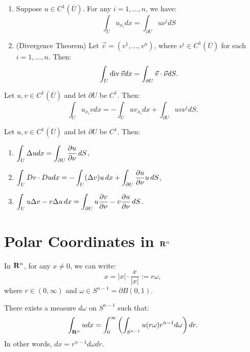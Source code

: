 \begin{theorem}
	\phantom{a}
	\begin{enumerate}[label = (\alph*),itemsep=1pt,topsep=3pt]
		\item Suppose $u \in C^1(\overline{U})$. For any $i=1,\ldots,n$, we have:
		\[
			\int_{U}^{} u_{x_i}dx = \int_{\partial U}^{} u \nu^i dS
		\]
		\item (Divergence Theorem) Let $\vec{v} = (v^1,\ldots,v^n)$, where $v^i \in C^1(\overline{U})$ for each $i=1,\ldots,n$. Then:
			\[
				\int_{U}^{} \operatorname{div} \vec{v}dx = \int_{\partial U}^{} \vec{v}\cdot \vec{\nu}dS.
			\] 	
	\end{enumerate}
\end{theorem}

\begin{theorem}
	Let $u,v \in C^1(\overline{U})$ and let $\partial U$ be $C^1$. Then:
	\[
		\int_{U}^{} u_{x_i}v dx = - \int_{U}^{} u v_{x_i} dx + \int_{\partial U}^{} uv \nu^i dS.
	\] 
\end{theorem}

\begin{theorem}
	Let $u,v \in C^1(\overline{U})$ and let $\partial U$ be $C^1$. Then:
	\begin{enumerate}[label = (\alph*),itemsep=1pt,topsep=3pt]
        \item $\displaystyle \int_U \Delta u dx = \int_{\partial U}\frac{\partial u}{\partial \nu}\,dS$,
        \item $\displaystyle \int_U Dv \cdot Du dx = -\int_U (\Delta v)u\,dx + \int_{\partial U}\frac{\partial u}{\partial \nu} u\,dS$, 
        \item $\displaystyle \int_U u \Delta v - v \Delta u\,dx = \int_{\partial U} u\frac{\partial v}{\partial \nu} - v \frac{\partial u}{\partial \nu}\,dS$.
    \end{enumerate}
\end{theorem}
	
\section{Polar Coordinates in $\mathbf{R}^n$ }

\begin{remark}
	In $\mathbf{R}^n$, for any $x \neq 0$, we can write:
	\[
	x = |x| \cdot \frac{x}{|x|} := r \omega,
	\] 
	where $r\in (0,\infty)$ and $\omega \in S^{n-1} = \partial B(0,1)$.
\end{remark}

\begin{theorem}
	There exists a measure $d \omega$ on $S^{n-1}$ such that:
	\[
		\int_{\mathbf{R}^n}^{}u dx = \int_{0}^{\infty} \left( \int_{S^{n-1}}^{} u(r \omega) r^{n-1}d \omega \right) dr.
	\] 
	In other words, $dx = r^{n-1}d\omega dr$.
\end{theorem}

